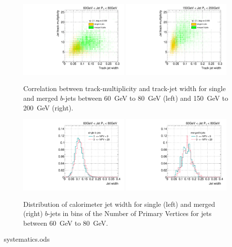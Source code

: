 \begin{figure}[tp]
\centering
\includegraphics[width=0.49\textwidth]{FIGS/VarsSingleMerged/NtrktrkWidth060.pdf}
\includegraphics[width=0.49\textwidth]{FIGS/VarsSingleMerged/NtrktrkWidth150.pdf}
\caption{Correlation between track-multiplicity and track-jet width for single and merged $b$-jets between 60~GeV to 80~GeV (left) and 150~GeV to 200~GeV (right).}
\label{fig:ntrktrkwidthsinglemerged}
\end{figure}



\begin{figure}[tp]
\centering
\includegraphics[width=0.49\textwidth]{FIGS/systematics/Widthsingle_060.pdf}
\includegraphics[width=0.49\textwidth]{FIGS/systematics/Widthmerged_060.pdf}
\caption{Distribution of calorimeter jet width for single (left) and merged (right) $b$-jets in bins of the Number of Primary Vertices for jets between 60~GeV to 80~GeV.}
\label{fig:calowidthpileup}
\end{figure}
systematics.ods

